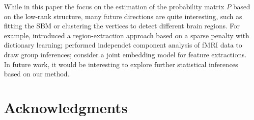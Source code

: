 \documentclass[journal,twoside,web]{ieeecolor}
\begin{document}
While in this paper the focus on the estimation of the probability matrix $P$ based on the low-rank structure, many future directions are quite interesting, such as fitting the SBM or clustering the vertices to detect different brain regions.
For example, \cite{abraham2013extracting} introduced a region-extraction approach based on a sparse penalty with dictionary learning; \cite{calhoun2001method} performed independet component analysis of fMRI data to draw group inferences; \cite{wang2017joint} consider a joint embedding model for feature extractions.
In future work, it would be interesting to explore further statistical inferences based on our method.



\section*{Acknowledgments}


\nocite{gorgolewski2015high,Garyfallidis2014-wg,Anderson2017-ra,behrens2007manual,brown1977means}




\end{document}
